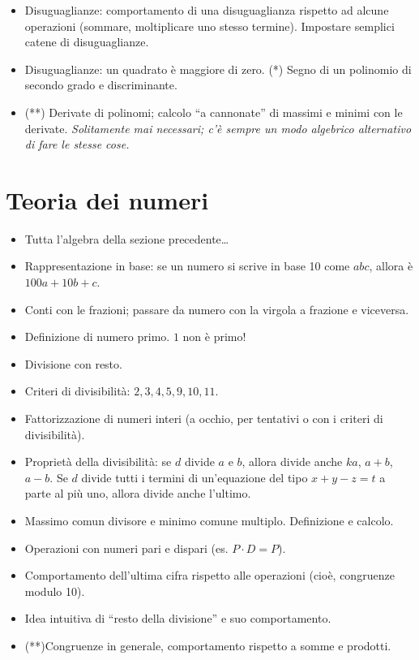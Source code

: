 \documentclass[a4paper,10pt]{paper}
\renewcommand{\star}{(*)}
\newcommand{\sstar}{(**)}
\begin{document}
\begin{itemize}
 \item Disuguaglianze: comportamento di una disuguaglianza rispetto ad alcune operazioni (sommare, moltiplicare uno stesso termine). Impostare semplici catene di disuguaglianze.
 \item Disuguaglianze: un quadrato è maggiore di zero. \star{} Segno di un polinomio di secondo grado e discriminante.
 \item \sstar{} Derivate di polinomi; calcolo ``a cannonate'' di massimi e minimi con le derivate. \emph{Solitamente mai necessari; c'è sempre un modo algebrico alternativo di fare le stesse cose.}
\end{itemize}

\section{Teoria dei numeri}
\begin{itemize}
 \item Tutta l'algebra della sezione precedente\dots
 \item Rappresentazione in base: se un numero si scrive in base 10 come $abc$, allora è $100a+10b+c$.
 \item Conti con le frazioni; passare da numero con la virgola a frazione e viceversa.
 \item Definizione di numero primo. $1$ non è primo!
 \item Divisione con resto.
 \item Criteri di divisibilità: $2,3,4,5,9,10,11$.
 \item Fattorizzazione di numeri interi (a occhio, per tentativi o con i criteri di divisibilità).
 \item Proprietà della divisibilità: se $d$ divide $a$ e $b$, allora divide anche $ka$, $a+b$, $a-b$. Se $d$ divide tutti i termini di un'equazione del tipo $x+y-z=t$ a parte al più uno, allora divide anche l'ultimo.
 \item Massimo comun divisore e minimo comune multiplo. Definizione e calcolo.
 \item Operazioni con numeri pari e dispari (es. $P\cdot D=P$).
 \item Comportamento dell'ultima cifra rispetto alle operazioni (cioè, congruenze modulo 10).
 \item Idea intuitiva di ``resto della divisione'' e suo comportamento.
 \item \sstar Congruenze in generale, comportamento rispetto a somme e prodotti.
\end{itemize}
\end{document}
